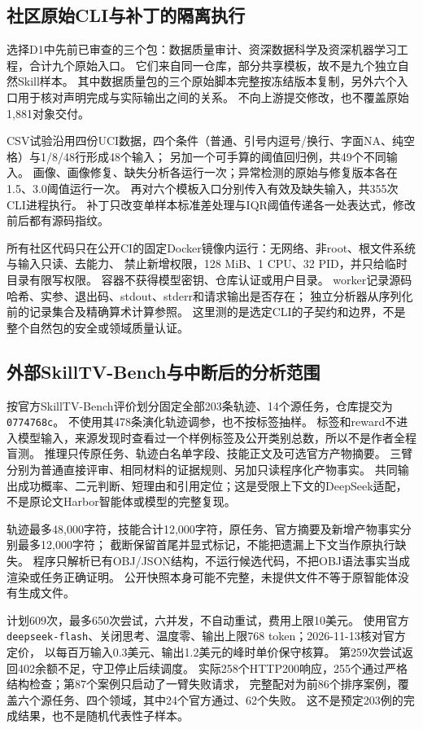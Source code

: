 \subsection{社区原始CLI与补丁的隔离执行}
选择D1中先前已审查的三个包：数据质量审计、资深数据科学及资深机器学习工程，合计九个原始入口。
它们来自同一仓库，部分共享模板，故不是九个独立自然Skill样本。
其中数据质量包的三个原始脚本完整按冻结版本复制，另外六个入口用于核对声明完成与实际输出之间的关系。
不向上游提交修改，也不覆盖原始1,881对象交付。

CSV试验沿用四份UCI数据，四个条件（普通、引号内逗号/换行、字面NA、纯空格）与1/8/48行形成48个输入；
另加一个可手算的阈值回归例，共49个不同输入。
画像、画像修复、缺失分析各运行一次；异常检测的原始与修复版本各在1.5、3.0阈值运行一次。
再对六个模板入口分别传入有效及缺失输入，共355次CLI进程执行。
补丁只改变单样本标准差处理与IQR阈值传递各一处表达式，修改前后都有源码指纹。

所有社区代码只在公开CI的固定Docker镜像内运行：无网络、非root、根文件系统与输入只读、去能力、
禁止新增权限，128 MiB、1 CPU、32 PID，并只给临时目录有限写权限。
容器不获得模型密钥、仓库认证或用户目录。
worker记录源码哈希、实参、退出码、stdout、stderr和请求输出是否存在；
独立分析器从序列化前的记录集合及精确算术计算参照。
这里测的是选定CLI的子契约和边界，不是整个自然包的安全或领域质量认证。

\subsection{外部SkillTV-Bench与中断后的分析范围}
按官方SkillTV-Bench评价划分固定全部203条轨迹、14个源任务，仓库提交为
\texttt{0774768c}\citep{S01}。
不使用其478条演化轨迹调参，也不按标签抽样。
标签和reward不进入模型输入，来源发现时查看过一个样例标签及公开类别总数，所以不是作者全程盲测。
推理只传原任务、轨迹白名单字段、技能正文及可选官方产物摘要。
三臂分别为普通直接评审、相同材料的证据规则、另加只读程序化产物事实。
共同输出成功概率、二元判断、短理由和引用定位；这是受限上下文的DeepSeek适配，不是原论文Harbor智能体或模型的完整复现。

轨迹最多48,000字符，技能合计12,000字符，原任务、官方摘要及新增产物事实分别最多12,000字符；
截断保留首尾并显式标记，不能把遗漏上下文当作原执行缺失。
程序只解析已有OBJ/JSON结构，不运行候选代码，不把OBJ语法事实当成渲染或任务正确证明。
公开快照本身可能不完整，未提供文件不等于原智能体没有生成文件。

计划609次，最多650次尝试，六并发，不自动重试，费用上限10美元。
使用官方 \texttt{deepseek-flash}、关闭思考、温度零、输出上限768 token；2026-11-13核对官方定价，
以每百万输入0.3美元、输出1.2美元的峰时单价保守核算。
第259次尝试返回402余额不足，守卫停止后续调度。
实际258个HTTP200响应，255个通过严格结构检查；第87个案例只启动了一臂失败请求，
完整配对为前86个排序案例，覆盖六个源任务、四个领域，其中24个官方通过、62个失败。
这不是预定203例的完成结果，也不是随机代表性子样本。

